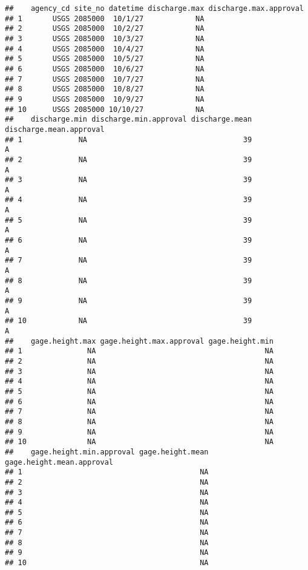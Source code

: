 \documentclass[]{article}
\begin{document}
\begin{verbatim}
##    agency_cd site_no datetime discharge.max discharge.max.approval
## 1       USGS 2085000  10/1/27            NA                       
## 2       USGS 2085000  10/2/27            NA                       
## 3       USGS 2085000  10/3/27            NA                       
## 4       USGS 2085000  10/4/27            NA                       
## 5       USGS 2085000  10/5/27            NA                       
## 6       USGS 2085000  10/6/27            NA                       
## 7       USGS 2085000  10/7/27            NA                       
## 8       USGS 2085000  10/8/27            NA                       
## 9       USGS 2085000  10/9/27            NA                       
## 10      USGS 2085000 10/10/27            NA                       
##    discharge.min discharge.min.approval discharge.mean discharge.mean.approval
## 1             NA                                    39                       A
## 2             NA                                    39                       A
## 3             NA                                    39                       A
## 4             NA                                    39                       A
## 5             NA                                    39                       A
## 6             NA                                    39                       A
## 7             NA                                    39                       A
## 8             NA                                    39                       A
## 9             NA                                    39                       A
## 10            NA                                    39                       A
##    gage.height.max gage.height.max.approval gage.height.min
## 1               NA                                       NA
## 2               NA                                       NA
## 3               NA                                       NA
## 4               NA                                       NA
## 5               NA                                       NA
## 6               NA                                       NA
## 7               NA                                       NA
## 8               NA                                       NA
## 9               NA                                       NA
## 10              NA                                       NA
##    gage.height.min.approval gage.height.mean gage.height.mean.approval
## 1                                         NA                          
## 2                                         NA                          
## 3                                         NA                          
## 4                                         NA                          
## 5                                         NA                          
## 6                                         NA                          
## 7                                         NA                          
## 8                                         NA                          
## 9                                         NA                          
## 10                                        NA
\end{verbatim}
\end{document}
